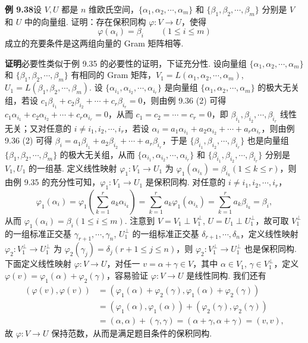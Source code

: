 \documentclass[UTF8,12pt,a4paper,fontset=fandol]{ctexart}
\begin{document}
\noindent\textbf{例 9.38}\quad 设 $V,U$ 都是 $n$ 维欧氏空间，$\{\alpha_1,\alpha_2,\cdots,\alpha_m\}$ 和 $\{\beta_1,\beta_2,\cdots,\beta_m\}$ 分别是 $V$ 和 $U$ 中的向量组. 证明：存在保积同构 $\varphi:V\to U$，使得
\[
\varphi(\alpha_i)=\beta_i\qquad (1\le i\le m)
\]
成立的充要条件是这两组向量的 Gram 矩阵相等.

\noindent\textbf{证明}\quad 必要性类似于例 9.35 的必要性的证明，下证充分性. 设向量组 $\{\alpha_1,\alpha_2,\cdots,\alpha_m\}$ 和 $\{\beta_1,\beta_2,\cdots,\beta_m\}$ 有相同的 Gram 矩阵，$V_1=L(\alpha_1,\alpha_2,\cdots,\alpha_m)$, $U_1=L(\beta_1,\beta_2,\cdots,\beta_m)$. 设 $\{\alpha_{i_1},\alpha_{i_2},\cdots,\alpha_{i_r}\}$ 是向量组 $\{\alpha_1,\alpha_2,\cdots,\alpha_m\}$ 的极大无关组，若设 $c_1\beta_{i_1}+c_2\beta_{i_2}+\cdots+c_r\beta_{i_r}=0$，则由例 9.36 (2) 可得 $c_1\alpha_{i_1}+c_2\alpha_{i_2}+\cdots+c_r\alpha_{i_r}=0$，从而 $c_1=c_2=\cdots=c_r=0$，即 $\beta_{i_1},\beta_{i_2},\cdots,\beta_{i_r}$ 线性无关；又对任意的 $i\ne i_1,i_2,\cdots,i_r$，若设 $\alpha_i=a_1\alpha_{i_1}+a_2\alpha_{i_2}+\cdots+a_r\alpha_{i_r}$，则由例 9.36 (2) 可得 $\beta_i=a_1\beta_{i_1}+a_2\beta_{i_2}+\cdots+a_r\beta_{i_r}$，于是 $\{\beta_{i_1},\beta_{i_2},\cdots,\beta_{i_r}\}$ 也是向量组 $\{\beta_1,\beta_2,\cdots,\beta_m\}$ 的极大无关组，从而 $\{\alpha_{i_1},\alpha_{i_2},\cdots,\alpha_{i_r}\}$ 和 $\{\beta_{i_1},\beta_{i_2},\cdots,\beta_{i_r}\}$ 分别是 $V_1,U_1$ 的一组基. 定义线性映射 $\varphi_1:V_1\to U_1$ 为 $\varphi_1(\alpha_{i_k})=\beta_{i_k}(1\le k\le r)$，则由例 9.35 的充分性可知，$\varphi_1:V_1\to U_1$ 是保积同构. 对任意的 $i\ne i_1,i_2,\cdots,i_r$，
\[
\varphi_1(\alpha_i)=\varphi_1\left(\sum_{k=1}^r a_k\alpha_{i_k}\right)
=\sum_{k=1}^r a_k\varphi_1(\alpha_{i_k})
=\sum_{k=1}^r a_k\beta_{i_k}=\beta_i,
\]
从而 $\varphi_1(\alpha_i)=\beta_i(1\le i\le m)$. 注意到 $V=V_1\perp V_1^\perp$, $U=U_1\perp U_1^\perp$，故可取 $V_1^\perp$ 的一组标准正交基 $\gamma_{r+1},\cdots,\gamma_n$, $U_1^\perp$ 的一组标准正交基 $\delta_{r+1},\cdots,\delta_n$，定义线性映射 $\varphi_2:V_1^\perp\to U_1^\perp$ 为 $\varphi_2(\gamma_j)=\delta_j(r+1\le j\le n)$，则 $\varphi_2:V_1^\perp\to U_1^\perp$ 也是保积同构. 下面定义线性映射 $\varphi:V\to U$，对任一 $v=\alpha+\gamma\in V$，其中 $\alpha\in V_1$, $\gamma\in V_1^\perp$，定义 $\varphi(v)=\varphi_1(\alpha)+\varphi_2(\gamma)$，容易验证 $\varphi:V\to U$ 是线性同构. 我们还有
\[
\begin{aligned}
(\varphi(v),\varphi(v))
&=(\varphi_1(\alpha)+\varphi_2(\gamma),\varphi_1(\alpha)+\varphi_2(\gamma))\\
&=(\varphi_1(\alpha),\varphi_1(\alpha))+(\varphi_2(\gamma),\varphi_2(\gamma))\\
&=(\alpha,\alpha)+(\gamma,\gamma)=(\alpha+\gamma,\alpha+\gamma)=(v,v),
\end{aligned}
\]
故 $\varphi:V\to U$ 保持范数，从而是满足题目条件的保积同构.
\end{document}
